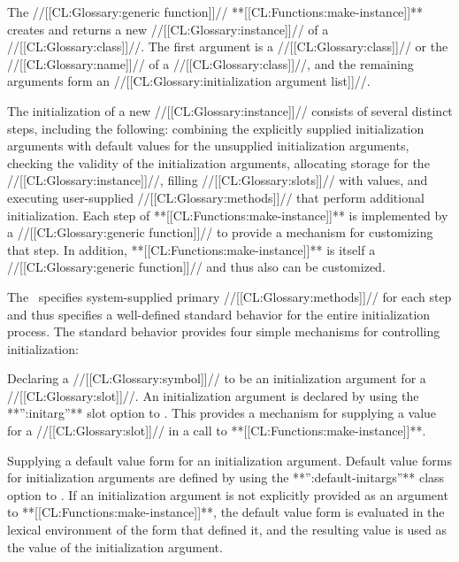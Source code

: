 


                      
The //[[CL:Glossary:generic function]]// **[[CL:Functions:make-instance]]** creates and returns a new
//[[CL:Glossary:instance]]// of a //[[CL:Glossary:class]]//.  The first argument is a //[[CL:Glossary:class]]// or
the //[[CL:Glossary:name]]// of a //[[CL:Glossary:class]]//, and the remaining arguments form an 
//[[CL:Glossary:initialization argument list]]//.

The initialization of a new //[[CL:Glossary:instance]]// consists of several distinct
steps, including the following: combining the explicitly supplied initialization
arguments with default values for the unsupplied initialization arguments, 
checking the validity of the initialization arguments, allocating storage 
for the //[[CL:Glossary:instance]]//, filling //[[CL:Glossary:slots]]// with
values, and executing user-supplied //[[CL:Glossary:methods]]// that perform additional
initialization.  Each step of **[[CL:Functions:make-instance]]** is implemented by a
//[[CL:Glossary:generic function]]// to provide a mechanism for customizing that step.  
In addition, **[[CL:Functions:make-instance]]** is itself a //[[CL:Glossary:generic function]]// 
and thus also can be customized.

The \OS\ specifies system-supplied primary //[[CL:Glossary:methods]]// for each step 
and thus specifies a well-defined standard behavior for the entire
initialization process.  The standard behavior provides four simple
mechanisms for controlling initialization:

\beginlist

\itemitem{\bull} Declaring a //[[CL:Glossary:symbol]]// to be an initialization argument 
for a //[[CL:Glossary:slot]]//.  An initialization argument is declared by using the
**'':initarg''** slot option to .  This provides a mechanism
for supplying a value for a //[[CL:Glossary:slot]]// in a call to **[[CL:Functions:make-instance]]**.

\itemitem{\bull} Supplying a default value form for an initialization argument.
Default value forms for initialization arguments are defined by using the
**'':default-initargs''** class option to .  If an 
initialization argument is not explicitly provided
as an argument to **[[CL:Functions:make-instance]]**, the default value form is
evaluated in the lexical environment of the  form that
defined it, and the resulting value is used as the value of the
initialization argument.

